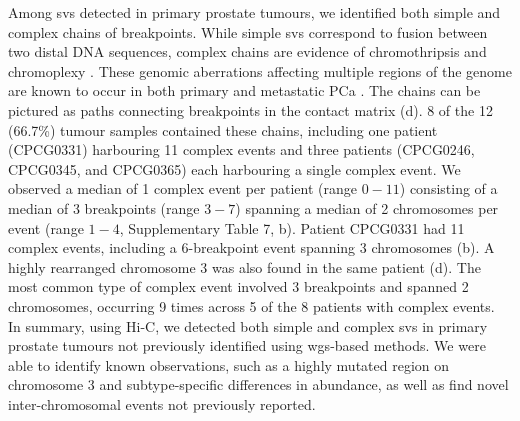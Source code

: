 
Among \glspl{sv} detected in primary prostate tumours, we identified both simple and complex chains of breakpoints.
While simple \glspl{sv} correspond to fusion between two distal DNA sequences, complex chains are evidence of chromothripsis and chromoplexy \cite{bacaPunctuatedEvolutionProstate2013}.
These genomic aberrations affecting multiple regions of the genome are known to occur in both primary and metastatic PCa \cite{bacaPunctuatedEvolutionProstate2013,fraserGenomicHallmarksLocalized2017,liPatternsSomaticStructural2020}.
The chains can be pictured as paths connecting breakpoints in the contact matrix (d).
8 of the 12 (66.7\%) tumour samples contained these chains, including one patient (CPCG0331) harbouring 11 complex events and three patients (CPCG0246, CPCG0345, and CPCG0365) each harbouring a single complex event.
We observed a median of 1 complex event per patient (range $0-11$) consisting of a median of 3 breakpoints (range $3-7$) spanning a median of 2 chromosomes per event (range $1-4$, Supplementary Table 7, b).
Patient CPCG0331 had 11 complex events, including a 6-breakpoint event spanning 3 chromosomes (b).
A highly rearranged chromosome 3 was also found in the same patient (d).
The most common type of complex event involved 3 breakpoints and spanned 2 chromosomes, occurring 9 times across 5 of the 8 patients with complex events.
In summary, using Hi-C, we detected both simple and complex \glspl{sv} in primary prostate tumours not previously identified using \gls{wgs}-based methods.
We were able to identify known observations, such as a highly mutated region on chromosome 3 and subtype-specific differences in abundance, as well as find novel inter-chromosomal events not previously reported.

